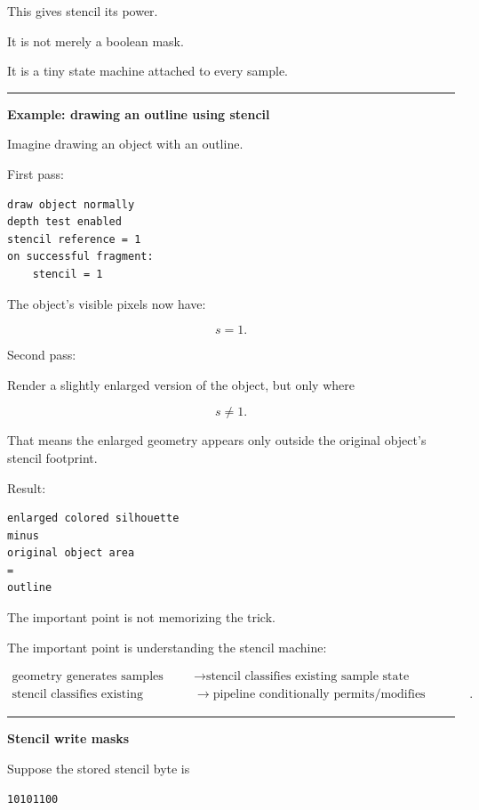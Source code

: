 This gives stencil its power.

It is not merely a boolean mask.

It is a tiny state machine attached to every sample.

\begin{center}\rule{0.5\linewidth}{0.5pt}\end{center}

\textbf{Example: drawing an outline using stencil}

Imagine drawing an object with an outline.

First pass:

\begin{verbatim}
draw object normally
depth test enabled
stencil reference = 1
on successful fragment:
    stencil = 1
\end{verbatim}

The object's visible pixels now have:

\[
s=1.
\]

Second pass:

Render a slightly enlarged version of the object, but only where

\[
s\neq1.
\]

That means the enlarged geometry appears only outside the original object's stencil footprint.

Result:

\begin{verbatim}
enlarged colored silhouette
minus
original object area
=
outline
\end{verbatim}

The important point is not memorizing the trick.

The important point is understanding the stencil machine:

\[\begin{aligned}\text{geometry generates samples} &\rightarrow \text{stencil classifies existing sample state}\\\text{stencil classifies existing sample state} &\rightarrow \text{pipeline conditionally permits/modifies fragments}.\end{aligned}\]

\begin{center}\rule{0.5\linewidth}{0.5pt}\end{center}

\textbf{Stencil write masks}

Suppose the stored stencil byte is

\begin{verbatim}
10101100
\end{verbatim}


